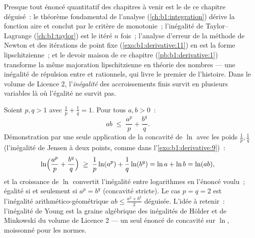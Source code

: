 \begin{remark}
Presque tout énoncé quantitatif des chapitres à venir est le  de ce chapitre déguisé~: le théorème fondamental
de l'analyse (\cref{ch:b1:integration}) dérive la fonction aire
et conclut par le critère de monotonie~; l'inégalité de
Taylor--Lagrange (\cref{ch:b1:taylor}) est le  itéré $n$ fois~; l'analyse d'erreur de la méthode de Newton
et des itérations de point fixe (\cref{exo:b1:derivative:11}) en est
la forme lipschitzienne~; et le devoir maison de ce chapitre
(\cref{pb:b1:derivative:1}) transforme la même majoration lipschitzienne en
théorie des nombres --- une inégalité de répulsion entre  et rationnels, qui livre le premier 
de l'histoire. Dans le volume de Licence 2, l'\emph{inégalité} des
accroissements finis survit en plusieurs variables là où l'égalité
ne survit pas.
\end{remark}

\begin{example}\label{ex:b1:derivative:young}
Soient $p, q > 1$ avec $\frac1p + \frac1q = 1$. Pour tous $a, b > 0$~:
\[
ab \;\leq\; \frac{a^p}{p} + \frac{b^q}{q} .
\]
Démonstration par une seule application de la concavité de $\ln$ avec les poids
$\frac1p, \frac1q$ (l'inégalité de Jensen à deux points, comme dans
l'\cref{exo:b1:derivative:9})~:
\[
\ln\Bigl(\frac{a^p}{p} + \frac{b^q}{q}\Bigr)
\;\geq\; \frac1p \ln(a^p) + \frac1q \ln(b^q)
= \ln a + \ln b = \ln(ab),
\]
et la croissance de $\ln$ convertit l'inégalité entre logarithmes en
l'énoncé voulu~; égalité si et seulement si $a^p = b^q$ (concavité stricte). Le
cas $p = q = 2$ est l'inégalité arithmético-géométrique $ab \leq
\frac{a^2 + b^2}{2}$ déguisée. L'idée à retenir~: l'inégalité de Young
est la graine algébrique des inégalités de Hölder et de Minkowski
du volume de Licence 2 --- un seul énoncé de concavité
sur $\ln$, moissonné pour les normes.
\end{example}


